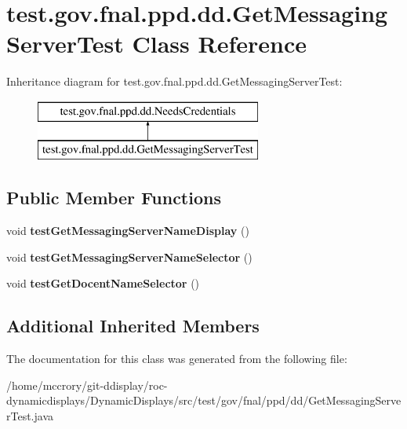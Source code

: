 \hypertarget{classtest_1_1gov_1_1fnal_1_1ppd_1_1dd_1_1GetMessagingServerTest}{\section{test.\-gov.\-fnal.\-ppd.\-dd.\-Get\-Messaging\-Server\-Test Class Reference}
\label{classtest_1_1gov_1_1fnal_1_1ppd_1_1dd_1_1GetMessagingServerTest}
}
Inheritance diagram for test.\-gov.\-fnal.\-ppd.\-dd.\-Get\-Messaging\-Server\-Test\-:\begin{figure}[H]
\begin{center}
\leavevmode
\includegraphics[height=2.000000cm]{classtest_1_1gov_1_1fnal_1_1ppd_1_1dd_1_1GetMessagingServerTest}
\end{center}
\end{figure}
\subsection*{Public Member Functions}
\begin{DoxyCompactItemize}
\item 
\hypertarget{classtest_1_1gov_1_1fnal_1_1ppd_1_1dd_1_1GetMessagingServerTest_a3601b6819ca638d7b1a0363eaa6ca475}{void {\bfseries test\-Get\-Messaging\-Server\-Name\-Display} ()}\label{classtest_1_1gov_1_1fnal_1_1ppd_1_1dd_1_1GetMessagingServerTest_a3601b6819ca638d7b1a0363eaa6ca475}

\item 
\hypertarget{classtest_1_1gov_1_1fnal_1_1ppd_1_1dd_1_1GetMessagingServerTest_a087a371914143672310e30fc4b71decc}{void {\bfseries test\-Get\-Messaging\-Server\-Name\-Selector} ()}\label{classtest_1_1gov_1_1fnal_1_1ppd_1_1dd_1_1GetMessagingServerTest_a087a371914143672310e30fc4b71decc}

\item 
\hypertarget{classtest_1_1gov_1_1fnal_1_1ppd_1_1dd_1_1GetMessagingServerTest_a797ca314d02f3394cad4c88f95eee5bc}{void {\bfseries test\-Get\-Docent\-Name\-Selector} ()}\label{classtest_1_1gov_1_1fnal_1_1ppd_1_1dd_1_1GetMessagingServerTest_a797ca314d02f3394cad4c88f95eee5bc}

\end{DoxyCompactItemize}
\subsection*{Additional Inherited Members}


The documentation for this class was generated from the following file\-:\begin{DoxyCompactItemize}
\item 
/home/mccrory/git-\/ddisplay/roc-\/dynamicdisplays/\-Dynamic\-Displays/src/test/gov/fnal/ppd/dd/Get\-Messaging\-Server\-Test.\-java\end{DoxyCompactItemize}
